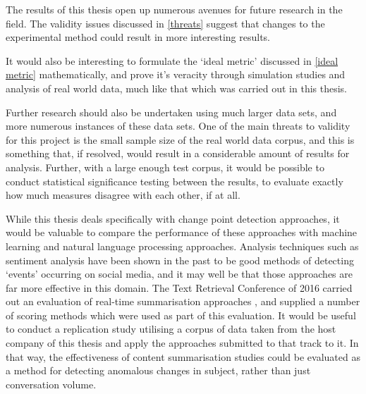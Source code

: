 \documentclass[../main.tex]{subfiles}
\begin{document}
The results of this thesis open up numerous avenues for future research in the field. The validity issues discussed in \autoref{threats} suggest that changes to the experimental method could result in more interesting results.

It would also be interesting to formulate the `ideal metric' discussed in \autoref{ideal metric} mathematically, and prove it's veracity through simulation studies and analysis of real world data, much like that which was carried out in this thesis.

Further research should also be undertaken using much larger data sets, and more numerous instances of these data sets. One of the main threats to validity for this project is the small sample size of the real world data corpus, and this is something that, if resolved, would result in a considerable amount of results for analysis. Further, with a large enough test corpus, it would be possible to conduct statistical significance testing between the results, to evaluate exactly how much measures disagree with each other, if at all.

While this thesis deals specifically with change point detection approaches, it would be valuable to compare the performance of these approaches with machine learning and natural language processing approaches. Analysis techniques such as sentiment analysis have been shown in the past to be good methods of detecting `events' occurring on social media, and it may well be that those approaches are far more effective in this domain. The Text Retrieval Conference of 2016 carried out an evaluation of real-time summarisation approaches \cite{trec2016}, and supplied a number of scoring methods which were used as part of this evaluation. It would be useful to conduct a replication study utilising a corpus of data taken from the host company of this thesis and apply the approaches submitted to that track to it. In that way, the effectiveness of content summarisation studies could be evaluated as a method for detecting anomalous changes in subject, rather than just conversation volume.
\end{document}
